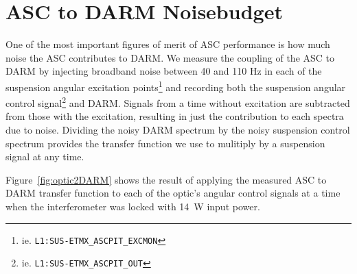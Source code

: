 \section{ASC to DARM Noisebudget}
One of the most important figures of merit of ASC performance is how
much noise the ASC contributes to DARM. We measure the coupling of the
ASC to DARM by injecting broadband noise between 40 and 110 Hz in each
of the suspension angular excitation
points\footnote{ie. \texttt{L1:SUS-ETMX\_ASCPIT\_EXCMON}} and
recording both the suspension angular control
signal\footnote{ie. \texttt{L1:SUS-ETMX\_ASCPIT\_OUT}} and
DARM. Signals from a time without excitation are subtracted from those
with the excitation, resulting in just the contribution to each
spectra due to noise. Dividing the noisy DARM spectrum by the noisy
suspension control spectrum provides the transfer function we use to
mulitiply by a suspension signal at any time. 


Figure~\ref{fig:optic2DARM} shows the result of applying the measured
ASC to DARM transfer function to each of the optic's angular control signals at
a time when the interferometer was locked with 14~W input power.

